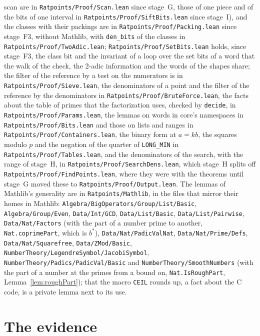 scan are in \verb|Ratpoints/Proof/Scan.lean| since stage~G, those of one piece and of the bits of
one interval in \verb|Ratpoints/Proof/SiftBits.lean| since stage~I), and the classes with their
packings are in \verb|Ratpoints/Proof/Packing.lean| since stage~F3, without Mathlib, with
\verb|den_bits| of the classes in \verb|Ratpoints/Proof/TwoAdic.lean|;
\verb|Ratpoints/Proof/SetBits.lean| holds, since stage~F3, the class bit and the invariant of a loop
over the set bits of a word that the walk of the check, the 2-adic information and the words of the
shapes share; the filter of the reference by a test on the numerators is in
\verb|Ratpoints/Proof/Sieve.lean|, the denominators of a point and the filter of the reference by
the denominators in \verb|Ratpoints/Proof/BruteForce.lean|, the facts about the table of primes that
the factorization uses, checked by \verb|decide|, in \verb|Ratpoints/Proof/Params.lean|, the lemmas
on words in core's namespaces in \verb|Ratpoints/Proof/Bits.lean| and those on lists and ranges in
\verb|Ratpoints/Proof/Containers.lean|, the binary form at $a = k b$, the squares modulo $p$ and the
negation of the quarter of \verb|LONG_MIN| in \verb|Ratpoints/Proof/Tables.lean|, and the
denominators of the search, with the range of stage~H, in \verb|Ratpoints/Proof/SearchDens.lean|,
which stage~H splits off \verb|Ratpoints/Proof/FindPoints.lean|, where they were with the theorems
until stage~G moved these to \verb|Ratpoints/Proof/Output.lean|. The lemmas of Mathlib's generality
are in \verb|Ratpoints/Mathlib|, in the files that mirror their homes in Mathlib:
\verb|Algebra/BigOperators/Group/List/Basic|, \verb|Algebra/Group/Even|, \verb|Data/Int/GCD|,
\verb|Data/List/Basic|, \verb|Data/List/Pairwise|, \verb|Data/Nat/Factors| (with the part of a
number prime to another, \verb|Nat.coprimePart|, which is $b^*$), \verb|Data/Nat/PadicValNat|,
\verb|Data/Nat/Prime/Defs|, \verb|Data/Nat/Squarefree|, \verb|Data/ZMod/Basic|,
\verb|NumberTheory/LegendreSymbol/JacobiSymbol|, \verb|NumberTheory/Padics/PadicVal/Basic| and
\verb|NumberTheory/SmoothNumbers| (with the part of a number at the primes from a bound on,
\verb|Nat.IsRoughPart|, Lemma~\ref{lem:roughPart}); that the macro \verb|CEIL| rounds up, a fact
about the C code, is a private lemma next to its use.

\section{The evidence}\label{sec:den-evidence}


